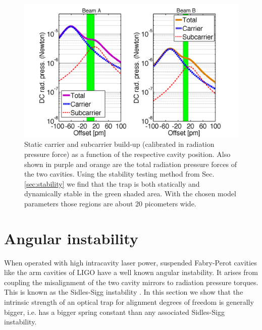 \begin{figure}[htbp]
	\centering
		\includegraphics[width=.7\textwidth]{figures/theory/DC_offset_paper6.pdf}
	\caption[Static carrier and subcarrier build-up]{Static carrier and subcarrier build-up (calibrated in radiation pressure force) as a function of the respective cavity position. Also shown in purple and orange are the total radiation pressure forces of the two cavities. Using the stability testing method from Sec. \ref{sec:stability} we find that the trap is both statically and dynamically stable in the green shaded area.
With the chosen model parameters those regions are about 
20 picometers wide.}
	\label{fig:stability_region}
\end{figure}


\section{Angular instability}
\label{sec:IV} 
When operated with high intracavity laser power, suspended Fabry-Perot cavities like the arm cavities of LIGO have a well known angular instability. It  arises from coupling the misalignment of the two cavity mirrors to radiation pressure torques. This is known as the Sidles-Sigg instability \cite{Sidles06}. In this section we show that the intrinsic strength of an optical trap for alignment degrees of freedom is generally bigger, i.e. has a bigger spring constant than any associated Sidles-Sigg instability. 

